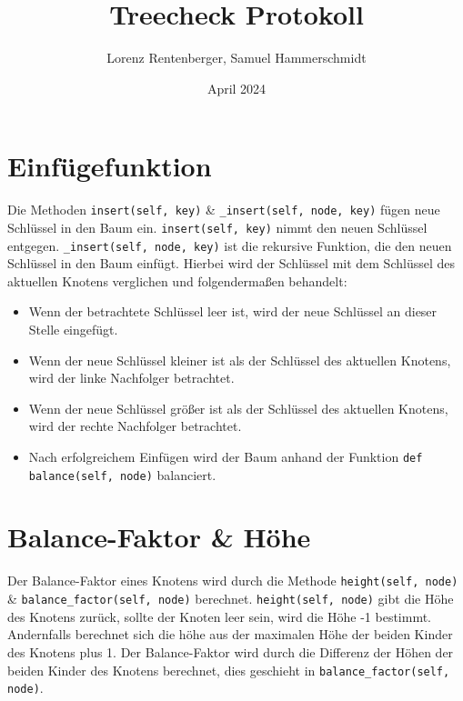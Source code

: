 \documentclass{article}
\title{Treecheck Protokoll}
\author{Lorenz Rentenberger, Samuel Hammerschmidt}
\date{April 2024}
\begin{document}
\maketitle

\section*{Einfügefunktion}
Die Methoden \texttt{insert(self, key)} & \texttt{_insert(self, node, key)} fügen neue Schlüssel in den Baum ein. \texttt{insert(self, key)} nimmt den neuen Schlüssel entgegen.
\texttt{_insert(self, node, key)} ist die rekursive Funktion, die den neuen Schlüssel in den Baum einfügt. Hierbei wird der Schlüssel mit dem Schlüssel des aktuellen Knotens verglichen und folgendermaßen behandelt:
\begin{itemize}
    \item Wenn der betrachtete Schlüssel leer ist, wird der neue Schlüssel an dieser Stelle eingefügt.
    \item Wenn der neue Schlüssel kleiner ist als der Schlüssel des aktuellen Knotens, wird der linke Nachfolger betrachtet.
    \item Wenn der neue Schlüssel größer ist als der Schlüssel des aktuellen Knotens, wird der rechte Nachfolger betrachtet.
    \item Nach erfolgreichem Einfügen wird der Baum anhand der Funktion \texttt{def balance(self, node)} balanciert.
\end{itemize}

\section*{Balance-Faktor & Höhe}
Der Balance-Faktor eines Knotens wird durch die Methode \texttt{height(self, node)} & \texttt{balance_factor(self, node)} berechnet. \texttt{height(self, node)} gibt die Höhe des Knotens zurück, sollte der Knoten leer sein, wird die Höhe -1 bestimmt.
Andernfalls berechnet sich die höhe aus der maximalen Höhe der beiden Kinder des Knotens plus 1. Der Balance-Faktor wird durch die Differenz der Höhen der beiden Kinder des Knotens berechnet, dies geschieht in \texttt{balance_factor(self, node)}.
\end{document}
